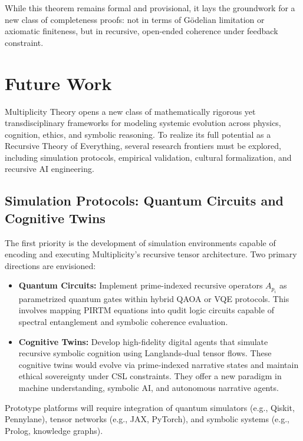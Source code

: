 \documentclass{article}
\theoremstyle{plain}
\begin{document}
While this theorem remains formal and provisional, it lays the groundwork for a new class of completeness proofs: not in terms of Gödelian limitation or axiomatic finiteness, but in recursive, open-ended coherence under feedback constraint.

\section{Future Work}

Multiplicity Theory opens a new class of mathematically rigorous yet transdisciplinary frameworks for modeling systemic evolution across physics, cognition, ethics, and symbolic reasoning. To realize its full potential as a Recursive Theory of Everything, several research frontiers must be explored, including simulation protocols, empirical validation, cultural formalization, and recursive AI engineering.

\subsection{Simulation Protocols: Quantum Circuits and Cognitive Twins}

The first priority is the development of simulation environments capable of encoding and executing Multiplicity’s recursive tensor architecture. Two primary directions are envisioned:

\begin{itemize}
    \item \textbf{Quantum Circuits:} Implement prime-indexed recursive operators \( A_{p_i} \) as parametrized quantum gates within hybrid QAOA or VQE protocols. This involves mapping PIRTM equations into qudit logic circuits capable of spectral entanglement and symbolic coherence evaluation.
    
    \item \textbf{Cognitive Twins:} Develop high-fidelity digital agents that simulate recursive symbolic cognition using Langlands-dual tensor flows. These cognitive twins would evolve via prime-indexed narrative states and maintain ethical sovereignty under CSL constraints. They offer a new paradigm in machine understanding, symbolic AI, and autonomous narrative agents.
\end{itemize}

Prototype platforms will require integration of quantum simulators (e.g., Qiskit, Pennylane), tensor networks (e.g., JAX, PyTorch), and symbolic systems (e.g., Prolog, knowledge graphs).
\end{document}
